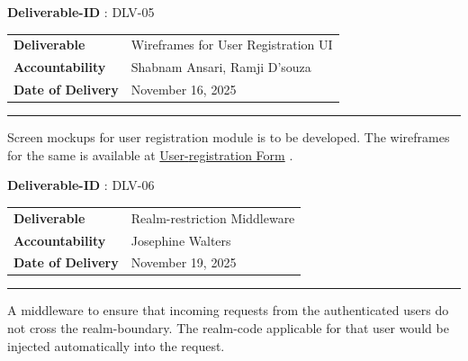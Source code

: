 \documentclass{article}%
\makeatletter
\renewcommand{\arraystretch}{1.5}%
\newcommand{\tinytosmall}{%
  \fontsize
    {\fpeval{(\f@size@tiny+\f@size@small)/2}}
    {\fpeval{(\f@baselineskip@tiny+\f@baselineskip@small)/2}}%
  \selectfont
}
\makeatother
\begin{document}
\begin{fancybox2}{\small \faChevronCircleRight \normalsize \xspace %
\tinytosmall%
\textbf{Deliverable{-}ID}%
: %
\xspace%
DLV{-}05%
\normalsize%
}%

\begin{tabularx}{\textwidth}{l X}
\rowcolor{lightapricot!50}%
\tinytosmall{\textbf{Deliverable}} & %
\tinytosmall{Wireframes for User Registration UI}%
\\%

\rowcolor{lightapricot!30} \tinytosmall{\textbf{Accountability}} & \tinytosmall{Shabnam Ansari, Ramji D'souza} \\
\rowcolor{lightapricot!10} \tinytosmall{\textbf{Date of Delivery}} & \tinytosmall{November 16, 2025} \\
\end{tabularx}%
\par%
\small%
\vspace{0.25\baselineskip}%
\rule{\textwidth}{0.4pt}%
\newline%
\vspace{0.25\baselineskip}%
\small%
Screen mockups for user registration module is to be developed. The wireframes for the same is available at %
\hyperlink{ID:571525042}{User{-}registration Form}%
\xspace%
.%
\normalsize%
\normalsize%
\end{fancybox2}%
\hypertarget{ID:1904608509}{}%
\begin{fancybox2}{\small \faChevronCircleRight \normalsize \xspace %
\tinytosmall%
\textbf{Deliverable{-}ID}%
: %
\xspace%
DLV{-}06%
\normalsize%
}%

\begin{tabularx}{\textwidth}{l X}
\rowcolor{lightapricot!50}%
\tinytosmall{\textbf{Deliverable}} & %
\tinytosmall{Realm{-}restriction Middleware}%
\\%

\rowcolor{lightapricot!30} \tinytosmall{\textbf{Accountability}} & \tinytosmall{Josephine Walters} \\
\rowcolor{lightapricot!10} \tinytosmall{\textbf{Date of Delivery}} & \tinytosmall{November 19, 2025} \\
\end{tabularx}%
\par%
\small%
\vspace{0.25\baselineskip}%
\rule{\textwidth}{0.4pt}%
\newline%
\vspace{0.25\baselineskip}%
\small%
A middleware to ensure that incoming requests from the authenticated users do not cross the realm{-}boundary. The realm{-}code applicable for that user would be injected automatically into the request.%
\normalsize%
\normalsize%
\end{fancybox2}%
\end{document}
